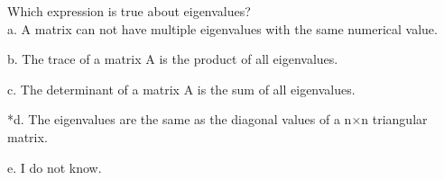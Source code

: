 
Which expression is true about eigenvalues?\\

a. A matrix can not have multiple eigenvalues with the same numerical value. 

b. The trace of a matrix A is the product of all eigenvalues. 

c. The determinant of a matrix A is the sum of all eigenvalues. 

*d. The eigenvalues are the same as the diagonal values of a n$\times$n triangular matrix.

e. I do not know.\\

